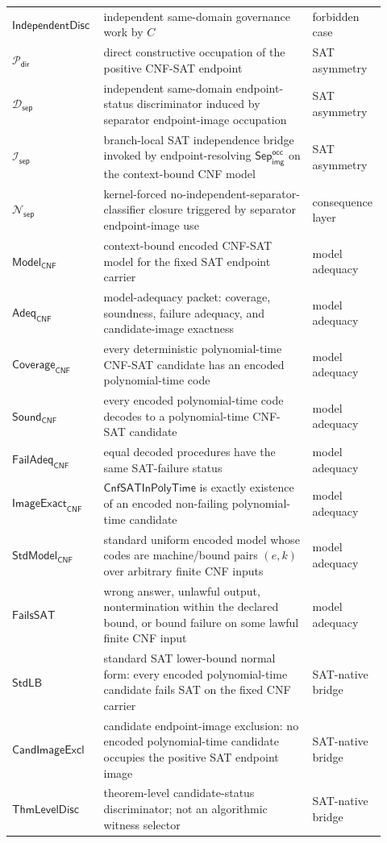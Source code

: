 \documentclass[11pt]{article}
\theoremstyle{definition}
\theoremstyle{remark}
\newcommand{\SepImgOcc}{\mathsf{Sep}_{\mathsf{img}}^{\mathsf{occ}}}
\newcommand{\CnfSATP}{\mathsf{CnfSATInPolyTime}}
\newcommand{\IndDisc}{\mathsf{IndependentDisc}}
\newcommand{\DirPos}{\mathcal{P}_{\mathsf{dir}}}
\newcommand{\SepIndBridge}{\mathcal{I}_{\mathsf{sep}}}
\newcommand{\SepDisc}{\mathcal{D}_{\mathsf{sep}}}
\newcommand{\NoSepDisc}{\mathcal{N}_{\mathsf{sep}}}
\newcommand{\ModelOfCnf}{\mathsf{Model}_{\mathsf{CNF}}}
\newcommand{\ModelAdeq}{\mathsf{Adeq}_{\mathsf{CNF}}}
\newcommand{\ModelCoverage}{\mathsf{Coverage}_{\mathsf{CNF}}}
\newcommand{\ModelSound}{\mathsf{Sound}_{\mathsf{CNF}}}
\newcommand{\FailureAdeq}{\mathsf{FailAdeq}_{\mathsf{CNF}}}
\newcommand{\ImageExact}{\mathsf{ImageExact}_{\mathsf{CNF}}}
\newcommand{\FailsSAT}{\mathsf{FailsSAT}}
\newcommand{\StdLB}{\mathsf{StdLB}}
\newcommand{\CandImageExcl}{\mathsf{CandImageExcl}}
\newcommand{\ThmLevelDisc}{\mathsf{ThmLevelDisc}}
\begin{document}
\begin{longtable}{>{\raggedright\arraybackslash}p{0.21\linewidth}>{\raggedright\arraybackslash}p{0.54\linewidth}>{\raggedright\arraybackslash}p{0.17\linewidth}}
\(\IndDisc\) & independent same-domain governance work by \(C\) & forbidden case \\
\(\DirPos\) & direct constructive occupation of the positive CNF-SAT endpoint & SAT asymmetry \\
\(\SepDisc\) & independent same-domain endpoint-status discriminator induced by separator endpoint-image occupation & SAT asymmetry \\
\(\SepIndBridge\) & branch-local SAT independence bridge invoked by endpoint-resolving \(\SepImgOcc\) on the context-bound CNF model & SAT asymmetry \\
\(\NoSepDisc\) & kernel-forced no-independent-separator-classifier closure triggered by separator endpoint-image use & consequence layer \\
\(\ModelOfCnf\) & context-bound encoded CNF-SAT model for the fixed SAT endpoint carrier & model adequacy \\
\(\ModelAdeq\) & model-adequacy packet: coverage, soundness, failure adequacy, and candidate-image exactness & model adequacy \\
\(\ModelCoverage\) & every deterministic polynomial-time CNF-SAT candidate has an encoded polynomial-time code & model adequacy \\
\(\ModelSound\) & every encoded polynomial-time code decodes to a polynomial-time CNF-SAT candidate & model adequacy \\
\(\FailureAdeq\) & equal decoded procedures have the same SAT-failure status & model adequacy \\
\(\ImageExact\) & \(\CnfSATP\) is exactly existence of an encoded non-failing polynomial-time candidate & model adequacy \\
\(\mathsf{StdModel}_{\mathsf{CNF}}\) & standard uniform encoded model whose codes are machine/bound pairs \((e,k)\) over arbitrary finite CNF inputs & model adequacy \\
\(\FailsSAT\) & wrong answer, unlawful output, nontermination within the declared bound, or bound failure on some lawful finite CNF input & model adequacy \\
\(\StdLB\) & standard SAT lower-bound normal form: every encoded polynomial-time candidate fails SAT on the fixed CNF carrier & SAT-native bridge \\
\(\CandImageExcl\) & candidate endpoint-image exclusion: no encoded polynomial-time candidate occupies the positive SAT endpoint image & SAT-native bridge \\
\(\ThmLevelDisc\) & theorem-level candidate-status discriminator; not an algorithmic witness selector & SAT-native bridge \\

\end{longtable}
\end{document}
